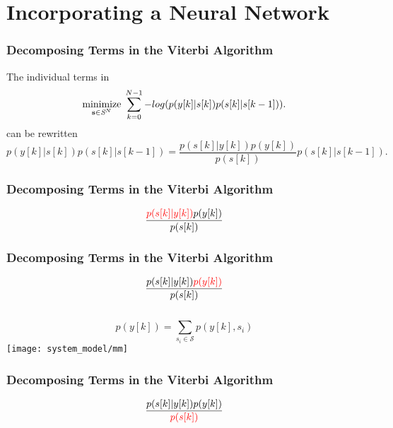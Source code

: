 \documentclass[10pt,tgadventor, onlymath]{beamer}
\begin{document}
\section{Incorporating a Neural Network}

\begin{frame}
\frametitle{Decomposing Terms in the Viterbi Algorithm}
The individual terms in
\begin{equation*}\label{opt_problem}
\underset{\mathbf{s}\in\textit{\cal{S}}^N}{\text{minimize}}\; \sum_{k=0}^{N-1} -log(p(y[k]|s[k])p(s[k]|s[k-1])).
\end{equation*}
can be rewritten 
\begin{equation*}
p(y[k]|s[k])p(s[k]|s[k-1]) = \frac{p(s[k]|y[k])p(y[k])}{p(s[k])}p(s[k]|s[k-1]).
\end{equation*}
\end{frame}

\begin{frame}
	\frametitle{Decomposing Terms in the Viterbi Algorithm}
\begin{equation*}
\frac{\textcolor{red}{p(s[k]|y[k])}p(y[k])}{p(s[k])}
\end{equation*}
\begin{figure}[H]
	
\end{figure}
\end{frame}

\begin{frame}
	\frametitle{Decomposing Terms in the Viterbi Algorithm }
\begin{equation*}
\frac{p(s[k]|y[k])\textcolor{red}{p(y[k])}}{p(s[k])}
\end{equation*}
\\
\begin{equation*}
p(y[k]) = \sum_{s_i \in \mathcal{S}} p(y[k],s_i)
\end{equation*}
\centering
	\texttt{[image: system\_model/mm]}
\end{frame}

\begin{frame}
	\frametitle{Decomposing Terms in the Viterbi Algorithm}
\begin{equation*}
\frac{p(s[k]|y[k])p(y[k])}{\textcolor{red}{p(s[k])}}
\end{equation*}
\end{frame}
\end{document}
